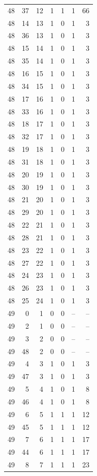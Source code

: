 \begin{longtable}{rrrrrrr}
48 & 37 & 12 & 1 & 1 & 1 & 66\\
48 & 14 & 13 & 1 & 0 & 1 & 3\\
48 & 36 & 13 & 1 & 0 & 1 & 3\\
48 & 15 & 14 & 1 & 0 & 1 & 3\\
48 & 35 & 14 & 1 & 0 & 1 & 3\\
48 & 16 & 15 & 1 & 0 & 1 & 3\\
48 & 34 & 15 & 1 & 0 & 1 & 3\\
48 & 17 & 16 & 1 & 0 & 1 & 3\\
48 & 33 & 16 & 1 & 0 & 1 & 3\\
48 & 18 & 17 & 1 & 0 & 1 & 3\\
48 & 32 & 17 & 1 & 0 & 1 & 3\\
48 & 19 & 18 & 1 & 0 & 1 & 3\\
48 & 31 & 18 & 1 & 0 & 1 & 3\\
48 & 20 & 19 & 1 & 0 & 1 & 3\\
48 & 30 & 19 & 1 & 0 & 1 & 3\\
48 & 21 & 20 & 1 & 0 & 1 & 3\\
48 & 29 & 20 & 1 & 0 & 1 & 3\\
48 & 22 & 21 & 1 & 0 & 1 & 3\\
48 & 28 & 21 & 1 & 0 & 1 & 3\\
48 & 23 & 22 & 1 & 0 & 1 & 3\\
48 & 27 & 22 & 1 & 0 & 1 & 3\\
48 & 24 & 23 & 1 & 0 & 1 & 3\\
48 & 26 & 23 & 1 & 0 & 1 & 3\\
48 & 25 & 24 & 1 & 0 & 1 & 3\\
49 & 0 & 1 & 0 & 0 & -- & --\\
49 & 2 & 1 & 0 & 0 & -- & --\\
49 & 3 & 2 & 0 & 0 & -- & --\\
49 & 48 & 2 & 0 & 0 & -- & --\\
49 & 4 & 3 & 1 & 0 & 1 & 3\\
49 & 47 & 3 & 1 & 0 & 1 & 3\\
49 & 5 & 4 & 1 & 0 & 1 & 8\\
49 & 46 & 4 & 1 & 0 & 1 & 8\\
49 & 6 & 5 & 1 & 1 & 1 & 12\\
49 & 45 & 5 & 1 & 1 & 1 & 12\\
49 & 7 & 6 & 1 & 1 & 1 & 17\\
49 & 44 & 6 & 1 & 1 & 1 & 17\\
49 & 8 & 7 & 1 & 1 & 1 & 23\\

\end{longtable}
